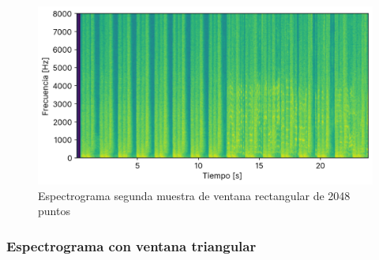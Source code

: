 \documentclass[12pt]{article}
\begin{document}
\begin{figure}[H]
\centering
\includegraphics{plot/cancion2_espectograma_boxcar_2048.png}
\caption{Espectrograma segunda muestra de ventana rectangular de 2048 puntos}
\label{cancion2_espectograma_boxcar_2048}
\end{figure}

\hypertarget{espectograma-ventana-triangular}{%
\subsubsection{Espectrograma con ventana triangular}\label{espectograma-ventana-triangular}}

\end{document}
